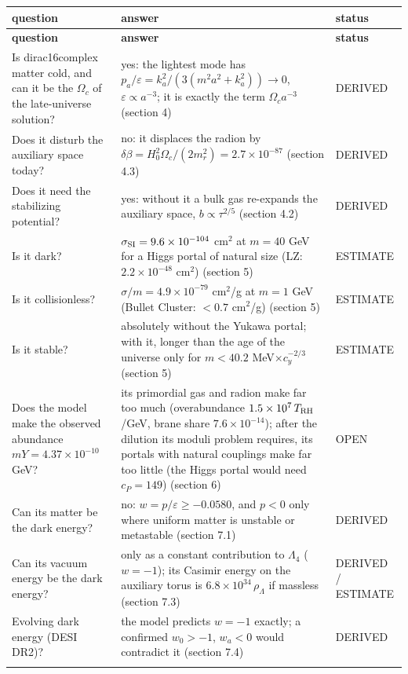 \documentclass[10pt,a4paper]{article}
\begin{document}
{\footnotesize
\begin{longtable}{>{\raggedright\arraybackslash}p{}>{\raggedright\arraybackslash}p{}>{\raggedright\arraybackslash}p{}}
\toprule
\textbf{question} & \textbf{answer} & \textbf{status} \\
\midrule\endfirsthead
\toprule
\textbf{question} & \textbf{answer} & \textbf{status} \\
\midrule\endhead
\endfoot
\bottomrule\endlastfoot
Is dirac16complex matter cold, and can it be the $\Omega_c$ of the late-universe solution? & yes: the lightest mode has $p_a/\varepsilon=k_a^2/(3(m^2a^2+k_a^2))\to0$, $\varepsilon\propto a^{-3}$; it is exactly the term $\Omega_ca^{-3}$ (section 4) & DERIVED \\
Does it disturb the auxiliary space today? & no: it displaces the radion by $\delta\beta=H_0^2\Omega_c/(2m_r^2)=2.7\times10^{-87}$ (section 4.3) & DERIVED \\
Does it need the stabilizing potential? & yes: without it a bulk gas re-expands the auxiliary space, $b\propto\tau^{2/5}$ (section 4.2) & DERIVED \\
Is it dark? & $\sigma_{\rm SI}=9.6\times10^{-104}$ cm$^2$ at $m=40$ GeV for a Higgs portal of natural size (LZ: $2.2\times10^{-48}$ cm$^2$) (section 5) & ESTIMATE \\
Is it collisionless? & $\sigma/m=4.9\times10^{-79}$ cm$^2$/g at $m=1$ GeV (Bullet Cluster: $<0.7$ cm$^2$/g) (section 5) & ESTIMATE \\
Is it stable? & absolutely without the Yukawa portal; with it, longer than the age of the universe only for $m<40.2$ MeV$\times c_y^{-2/3}$ (section 5) & ESTIMATE \\
Does the model make the observed abundance $mY=4.37\times10^{-10}$ GeV? & its primordial gas and radion make far too much (overabundance $1.5\times10^{7}\,T_{\rm RH}$/GeV, brane share $7.6\times10^{-14}$); after the dilution its moduli problem requires, its portals with natural couplings make far too little (the Higgs portal would need $c_P=149$) (section 6) & OPEN \\
Can its matter be the dark energy? & no: $w=p/\varepsilon\ge-0.0580$, and $p<0$ only where uniform matter is unstable or metastable (section 7.1) & DERIVED \\
Can its vacuum energy be the dark energy? & only as a constant contribution to $\Lambda_4$ ($w=-1$); its Casimir energy on the auxiliary torus is $6.8\times10^{34}\,\rho_\Lambda$ if massless (section 7.3) & DERIVED / ESTIMATE \\
Evolving dark energy (DESI DR2)? & the model predicts $w=-1$ exactly; a confirmed $w_0>-1$, $w_a<0$ would contradict it (section 7.4) & DERIVED \\*
\end{longtable}}
\end{document}
